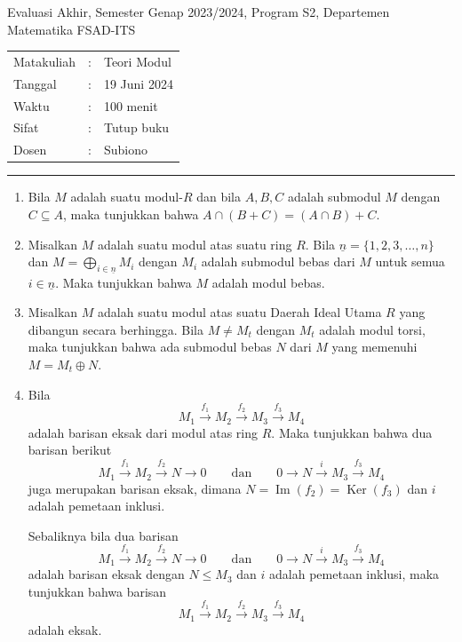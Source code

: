\documentclass[11pt,letterpaper]{article}
\newcommand{\Ker}{\operatorname{Ker}}
\newcommand{\Img}{\operatorname{Im}}
\begin{document}

\begin{center}
  Evaluasi Akhir, Semester Genap 2023/2024, Program S2, Departemen Matematika FSAD-ITS

  \vspace{0.3cm}
  \begin{tabular}{l c l}
    Matakuliah & : & Teori Modul  \\
    Tanggal    & : & 19 Juni 2024 \\
    Waktu      & : & 100 menit    \\
    Sifat      & : & Tutup buku   \\
    Dosen      & : & Subiono
  \end{tabular}

  \vspace{0.3cm}
  \rule{0.45\textwidth}{0.4pt}
\end{center}

\vspace{0.5cm}

\begin{enumerate}
  \item Bila $M$ adalah suatu modul-$R$ dan bila $A,B,C$ adalah submodul $M$ dengan $C \subseteq A$, maka tunjukkan bahwa
        $
          \boxed{A \cap (B+C) = (A \cap B) + C}.
        $

  \item Misalkan $M$ adalah suatu modul atas suatu ring $R$. Bila $\underline{n}=\{1,2,3,\ldots,n\}$ dan
        $
          M = \bigoplus_{i \in \underline{n}} M_i
        $
        dengan $M_i$ adalah submodul bebas dari $M$ untuk semua $i \in \underline{n}$. Maka tunjukkan bahwa $M$ adalah modul bebas.

  \item Misalkan $M$ adalah suatu modul atas suatu Daerah Ideal Utama $R$ yang dibangun secara berhingga. Bila $M \neq M_t$ dengan $M_t$ adalah modul torsi, maka tunjukkan bahwa ada submodul bebas $N$ dari $M$ yang memenuhi
        $
          M = M_t \oplus N.
        $

  \item Bila
        \[
          M_1 \xrightarrow{f_1} M_2 \xrightarrow{f_2} M_3 \xrightarrow{f_3} M_4
        \]
        adalah barisan eksak dari modul atas ring $R$. Maka tunjukkan bahwa dua barisan berikut
        \[
          M_1 \xrightarrow{f_1} M_2 \xrightarrow{f_2} N \to 0
          \qquad \text{dan} \qquad
          0 \to N \xrightarrow{i} M_3 \xrightarrow{f_3} M_4
          \tag{$A$}
        \]
        juga merupakan barisan eksak, dimana $N = \Img(f_2) = \Ker(f_3)$ dan $i$ adalah pemetaan inklusi.

        Sebaliknya bila dua barisan
        \[
          M_1 \xrightarrow{f_1} M_2 \xrightarrow{f_2} N \to 0
          \qquad \text{dan} \qquad
          0 \to N \xrightarrow{i} M_3 \xrightarrow{f_3} M_4
          \tag{$A$}
        \]
        adalah barisan eksak dengan $N \leq M_3$ dan $i$ adalah pemetaan inklusi, maka tunjukkan bahwa barisan
        \[
          M_1 \xrightarrow{f_1} M_2 \xrightarrow{f_2} M_3 \xrightarrow{f_3} M_4
          \tag{$B$}
        \]
        adalah eksak.
\end{enumerate}
\end{document}
